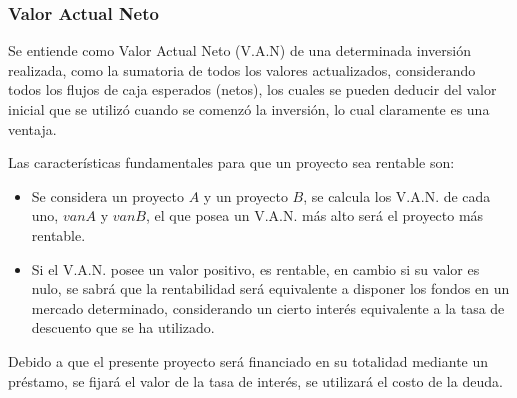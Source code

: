 \subsubsection{Valor Actual Neto}

Se entiende como Valor Actual Neto (V.A.N) de una determinada inversión realizada,
como la sumatoria de todos los valores actualizados, considerando todos los flujos
de caja esperados (netos), los cuales se pueden deducir del valor inicial
que se utilizó cuando se comenzó la inversión, lo cual claramente es una ventaja.

Las características fundamentales para que un proyecto sea rentable son:
\begin{itemize}
	\item Se considera un proyecto $A$ y un proyecto $B$, se calcula los V.A.N.
		  de cada uno, $vanA$ y $vanB$, el que posea un V.A.N. más alto
		  será el proyecto más rentable.
	\item Si el V.A.N. posee un valor positivo, es rentable, en cambio
		  si su valor es nulo, se sabrá que la rentabilidad será equivalente
		  a disponer los fondos en un mercado determinado, considerando un cierto
		  interés equivalente a la tasa de descuento que se ha utilizado.
\end{itemize}

Debido a que el presente proyecto será financiado en su totalidad mediante un préstamo,
se fijará el valor de la tasa de interés, se utilizará el costo de la deuda.


